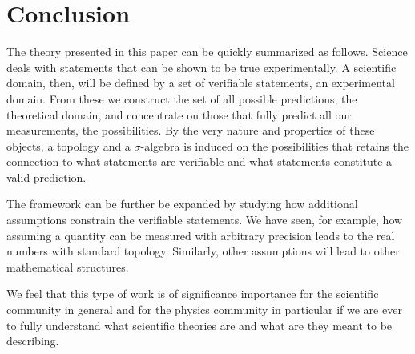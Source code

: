 \documentclass[letterpaper]{article}
\theoremstyle{plain}%
\theoremstyle{definition}
\theoremstyle{remark}
\begin{document}
\section{Conclusion}

The theory presented in this paper can be quickly summarized as follows. Science deals with statements that can be shown to be true experimentally. A scientific domain, then, will be defined by a set of verifiable statements, an experimental domain. From these we construct the set of all possible predictions, the theoretical domain, and concentrate on those that fully predict all our measurements, the possibilities. By the very nature and properties of these objects, a topology and a $\sigma$-algebra is induced on the possibilities that retains the connection to what statements are verifiable and what statements constitute a valid prediction.

The framework can be further be expanded by studying how additional assumptions constrain the verifiable statements. We have seen, for example, how assuming a quantity can be measured with arbitrary precision leads to the real numbers with standard topology. Similarly, other assumptions will lead to other mathematical structures.

We feel that this type of work is of significance importance for the scientific community in general and for the physics community in particular if we are ever to fully understand what scientific theories are and what are they meant to be describing.




\end{document}
